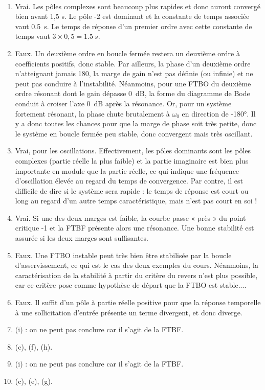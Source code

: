 \documentclass[10pt,fleqn]{article} %
\begin{document}
\ifprof
\begin{corrige} ~\\

\begin{enumerate}
\item Vrai. Les pôles complexes sont beaucoup plus rapides et donc auront convergé bien avant
1,5 s. Le pôle -2 est dominant et la constante de temps associée vaut \SI{0,5}{s}. Le temps de réponse
d’un premier ordre avec cette constante de temps vaut $3\times0,5 = \SI{1,5}{s}$.
\item Faux. Un deuxième ordre en boucle fermée restera un deuxième ordre à coefficients positifs,
donc stable. Par ailleurs, la phase d’un deuxième ordre n’atteignant jamais 180\degres, la marge de gain
n’est pas définie (ou infinie) et ne peut pas conduire à l’instabilité. Néanmoins, pour une FTBO
du deuxième ordre résonant dont le gain dépasse \SI{0}{dB}, la forme du diagramme de Bode conduit
à croiser l’axe \SI{0}{dB} après la résonance. Or, pour un système fortement résonant, la phase chute
brutalement à $\omega_0$ en direction de -180°. Il y a donc toutes les chances pour que la marge de phase
soit très petite, donc le système en boucle fermée peu stable, donc convergent mais très oscillant.
\item Vrai, pour les oscillations. Effectivement, les pôles dominants sont les pôles complexes (partie
réelle la plus faible) et la partie imaginaire est bien plus importante en module que la partie réelle,
ce qui indique une fréquence d’oscillation élevée au regard du temps de convergence. Par contre,
il est difficile de dire si le système sera rapide : le temps de réponse est court ou long au regard
d’un autre temps caractéristique, mais n’est pas court en soi !
\item Vrai. Si une des deux marges est faible, la courbe passe « près » du point critique -1 et la FTBF
présente alors une résonance. Une bonne stabilité est assurée si les deux marges sont suffisantes.
\item Faux. Une FTBO instable peut très bien être stabilisée par la boucle d’asservissement, ce qui
est le cas des deux exemples du cours. Néanmoins, la caractérisation de la
stabilité à partir du critère du revers n’est plus possible, car ce critère pose comme hypothèse de
départ que la FTBO est stable.... 
\item Faux. Il suffit d’un pôle à partie réelle positive pour que la réponse temporelle à une sollicitation
d’entrée présente un terme divergent, et donc diverge.
\item (i) : on ne peut pas conclure car il s'agit de la FTBF.
\item (c), (f), (h).
\item (i) : on ne peut pas conclure car il s'agit de la FTBF.
\item (c), (e), (g).

\end{enumerate}
\end{corrige}
\else
\fi
\end{document}
